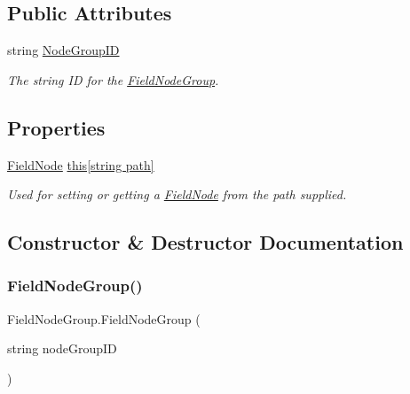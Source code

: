 \subsection*{Public Attributes}
\begin{DoxyCompactItemize}
\item 
string \hyperlink{class_field_node_group_ae9d21e6b498f2410b5a3c09f9bf3a0e8}{Node\+Group\+ID}
\begin{DoxyCompactList}\small\item\em The string ID for the \hyperlink{class_field_node_group}{Field\+Node\+Group}. \end{DoxyCompactList}\end{DoxyCompactItemize}
\subsection*{Properties}
\begin{DoxyCompactItemize}
\item 
\hyperlink{class_field_node}{Field\+Node} \hyperlink{class_field_node_group_a1d794aecafdb53386c2bbe91d3df805e}{this\mbox{[}string path\mbox{]}}
\begin{DoxyCompactList}\small\item\em Used for setting or getting a \hyperlink{class_field_node}{Field\+Node} from the path supplied. \end{DoxyCompactList}\end{DoxyCompactItemize}


\subsection{Constructor \& Destructor Documentation}
\mbox{\label{class_field_node_group_ad8e8912ee75dc63292ea2b65bf5034c5}} 
\subsubsection{\texorpdfstring{Field\+Node\+Group()}{FieldNodeGroup()}}
{\footnotesize\ttfamily Field\+Node\+Group.\+Field\+Node\+Group (\begin{DoxyParamCaption}\item[{string}]{node\+Group\+ID }\end{DoxyParamCaption})}



